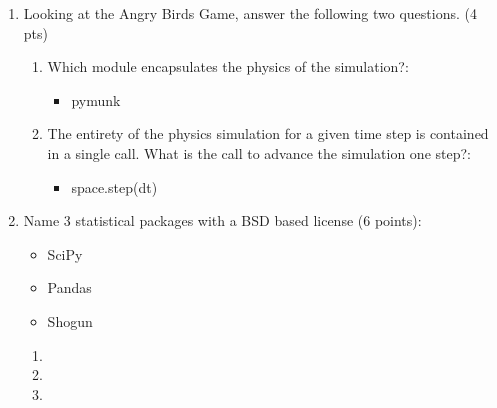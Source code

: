 \documentclass[10pt]{article}
\begin{document}
\begin{enumerate}
\begin{enumerate}
	\item Looking at the Angry Birds Game, answer the following two questions. (4 pts)
	\begin{enumerate}
		\item Which module encapsulates the physics of the simulation?:
		\beginanswers
		\begin{itemize}
			\item pymunk
		\end{itemize}
		\else
		\bigskip
		\bigskip
		\bigskip
		\bigskip
		\fi
		\item The entirety of the physics simulation for a given time step is contained in a single call. What is the call to advance the simulation one step?:
		\beginanswers
		\begin{itemize}
			\item space.step(dt) 
		\end{itemize}
		\else
		\bigskip
		\bigskip
		\bigskip
		\bigskip
		\fi
	\end{enumerate}
\bigskip
\bigskip
\item Name 3 statistical packages with a BSD based license (6 points):
\beginanswers
\begin{itemize}
	\item SciPy
	\item Pandas
	\item Shogun
\end{itemize}
\else
\begin{enumerate}
	\item 
	\bigskip
	\bigskip
	\item
	\bigskip
	\bigskip
	\item 
	\bigskip
	\bigskip
\end{enumerate}
\fi
\bigskip
\bigskip

\newpage


\end{enumerate}
\end{enumerate}
\end{document}
